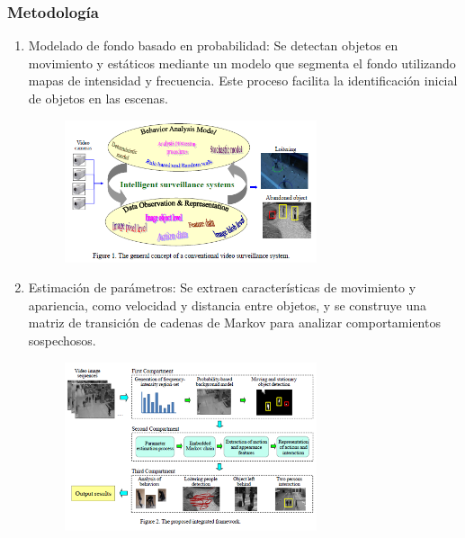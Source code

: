 \subsubsection{Metodología}
\begin{enumerate}

    \item Modelado de fondo basado en probabilidad: Se detectan objetos en movimiento y estáticos mediante un modelo que segmenta el fondo utilizando mapas de intensidad y frecuencia. Este proceso facilita la identificación inicial de objetos en las escenas.

    \begin{figure}[h] %
    \centering
    \includegraphics[width=0.7\textwidth]{4/met8.png} %
    \label{fig:ejemplo} %
    \end{figure}

    \item Estimación de parámetros: Se extraen características de movimiento y apariencia, como velocidad y distancia entre objetos, y se construye una matriz de transición de cadenas de Markov para analizar comportamientos sospechosos.

    \begin{figure}[h] %
    \centering
    \includegraphics[width=0.7\textwidth]{4/met8.1.png} %
    \label{fig:ejemplo} %
    \end{figure}


\end{enumerate}

